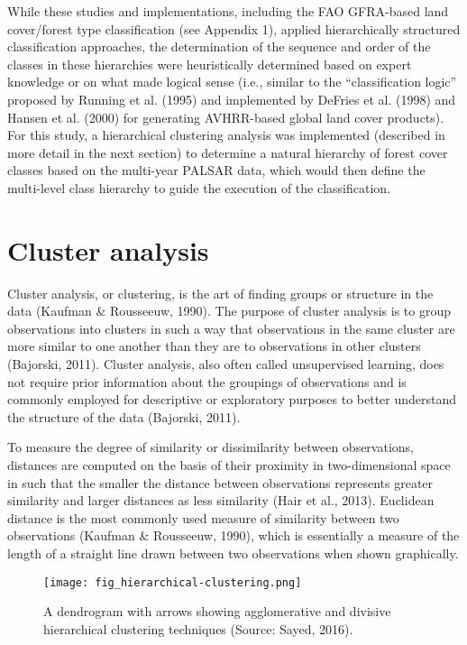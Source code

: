 While these studies and implementations, including the FAO GFRA-based land cover/forest type classification (see Appendix 1), applied hierarchically structured classification approaches, the determination of the sequence and order of the classes in these hierarchies were heuristically determined based on expert knowledge or on what made logical sense (i.e., similar to the \enquote{classification logic} proposed by Running et al. (1995) and implemented by DeFries et al. (1998) and Hansen et al. (2000) for generating AVHRR-based global land cover products). For this study, a hierarchical clustering analysis was implemented (described in more detail in the next section) to determine a natural hierarchy of forest cover classes based on the multi-year PALSAR data, which would then define the multi-level class hierarchy to guide the execution of the classification.

\section{Cluster analysis}
\label{sec: litrev-cluster-analysis}

Cluster analysis, or clustering, is the art of finding groups or structure in the data (Kaufman \& Rousseeuw, 1990). The purpose of cluster analysis is to group observations into clusters in such a way that observations in the same cluster are more similar to one another than they are to observations in other clusters (Bajorski, 2011). Cluster analysis, also often called unsupervised learning, does not require prior information about the groupings of observations and is commonly employed for descriptive or exploratory purposes to better understand the structure of the data (Bajorski, 2011).

To measure the degree of similarity or dissimilarity between observations, distances are computed on the basis of their proximity in two-dimensional space in such that the smaller the distance between observations represents greater similarity and larger distances as less similarity (Hair et al., 2013). Euclidean distance is the most commonly used measure of similarity between two observations (Kaufman \& Rousseeuw, 1990), which is essentially a measure of the length of a straight line drawn between two observations when shown graphically.

\begin{figure}
	\centering
	\texttt{[image: fig\_hierarchical-clustering.png]}
	\caption[A dendrogram with arrows showing agglomerative and divisive hierarchical clustering techniques.]{A dendrogram with arrows showing agglomerative and divisive hierarchical clustering techniques (Source: Sayed, 2016).}
	\label{fig: litrev-fig2.2}
\end{figure}

